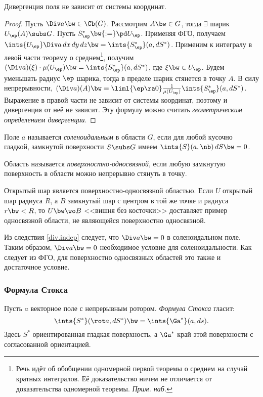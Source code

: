 \documentclass[a4paper]{article}
\begin{document}
\begin{imp}\label{div.indep}
Дивергенция поля не зависит от системы координат.
\end{imp}
\begin{proof}
Пусть $\Div a \bw\in \Cb(G)$. Рассмотрим $A \bw\in G$, тогда $\exi$ шарик $U_\ep(A) \subs G$. Пусть
$S^*_\ep \bw{:=} \pd U_\ep$. Применяя ФГО, получаем $\ints{U_\ep} \Div a \,d x \,d y \,d z \bw=
\ints{S^*_\ep}(a, d S^*)$. Применим к интегралу в левой части теорему о среднем\footnote{Речь идёт об
обобщении одномерной первой теоремы о среднем на случай кратных интегралов. Её доказательство
ничем не отличается от доказательства одномерной теоремы. \emph{Прим. наб.}}, получим $(\Div a)(\xi)\cdot \mu(U_\ep)
\bw= \ints{S^*_\ep}(a, d S^*)$, где $\xi \bw\in U_\ep$. Будем уменьшать радиус $\ep$ шарика, тогда в
пределе шарик стянется в точку $A$. В силу непрерывности, $(\Div a)(A) \bw= \liml{\ep \ra 0}
\frac{1}{\mu(U_\ep)} \ints{S^*_\ep}(a, d S^*)$. Выражение в правой части не зависит от системы координат,
поэтому и дивергенция от неё не зависит. Эту формулу можно считать \emph{геометрическим определением
дивергенции}.
\end{proof}

\begin{df}
Поле $a$ называется \emph{соленоидальным} в области $G$, если для любой кусочно гладкой, замкнутой
поверхности $S \subs G$ имеем $\ints{S}(a,\nb) \,d S \bw= 0$.
\end{df}

\begin{df}
Область называется \emph{поверхностно-односвязной}, если любую замкнутую поверхность в области
можно непрерывно стянуть в точку.
\end{df}
\begin{ex}
Открытый шар является поверхностно-односвязной областью. Если $U$ открытый шар радиуса $R$, а
$B$ замкнутый шар с центром в той же точке и радиуса $r \bw< R$, то $U \bw\wo B$ <<вишня
без косточки>> доставляет пример односвязной области, не являющейся поверхностно односвязной.
\end{ex}

Из следствия \ref{div.indep} следует, что $\Div a \bw= 0$ в соленоидальном поле. Таким
образом, $\Div a \bw= 0$ необходимое условие для соленоидальности. Как следует из ФГО,
для поверхностно односвязных областей это также и достаточное условие.

\subsubsection{Формула Стокса}
Пусть $a$ векторное поле с непрерывным ротором. \emph{Формула Стокса} гласит:
$$
  \ints{S^*}(\rot a, d S^*) \bw= \ints{\Ga^*}(a, d s).
$$
Здесь $S^*$ ориентированная гладкая поверхность, а $\Ga^*$ край этой поверхности с
согласованной ориентацией.
\end{document}
